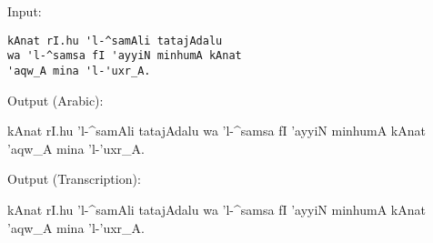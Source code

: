 \documentclass{beamer}
\begin{document}
\begin{frame}[fragile]
    Input:
    \vspace{-1ex}
    \begin{verbatim}kAnat rI.hu 'l-^samAli tatajAdalu
wa 'l-^samsa fI 'ayyiN minhumA kAnat
'aqw_A mina 'l-'uxr_A.\end{verbatim}

    Output (Arabic):
    \smallskip
    \begin{arab}[fullvoc]
        kAnat rI.hu 'l-^samAli tatajAdalu
        wa 'l-^samsa fI 'ayyiN minhumA kAnat 'aqw_A mina 'l-'uxr_A.
    \end{arab}

    \bigskip

    Output (Transcription):
    \smallskip
    \begin{arab}[trans]
        kAnat rI.hu 'l-^samAli tatajAdalu
        wa 'l-^samsa fI 'ayyiN minhumA kAnat 'aqw_A mina 'l-'uxr_A.
    \end{arab}
\end{frame}
\end{document}
